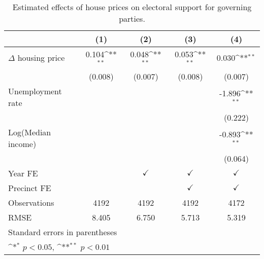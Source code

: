 \begin{table}[htbp]\centering
\def\sym#1{\ifmmode^{#1}\else\(^{#1}\)\fi}
\caption{Estimated effects of house prices on electoral support for governing parties.} \label{predv}
\begin{tabular}{l*{4}{c}}
\hline\hline
                    &\multicolumn{1}{c}{(1)}        &\multicolumn{1}{c}{(2)}        &\multicolumn{1}{c}{(3)}        &\multicolumn{1}{c}{(4)}        \\
\hline
$\Delta$ housing price&       0.104\sym{**}&       0.048\sym{**}&       0.053\sym{**}&       0.030\sym{**}\\
                    &     (0.008)        &     (0.007)        &     (0.008)        &     (0.007)        \\
[1em]
Unemployment rate   &                    &                    &                    &      -1.896\sym{**}\\
                    &                    &                    &                    &     (0.222)        \\
[1em]
Log(Median income)  &                    &                    &                    &      -0.893\sym{**}\\
                    &                    &                    &                    &     (0.064)        \\
[1em]
\hline Year FE      &                    &$\checkmark$        &$\checkmark$        &$\checkmark$        \\
[1em]
Precinct FE         &                    &                    &$\checkmark$        &$\checkmark$        \\
\hline
Observations        &        4192        &        4192        &        4192        &        4172        \\
RMSE                &       8.405        &       6.750        &       5.713        &       5.319        \\
\hline\hline
\multicolumn{5}{l}{\footnotesize Standard errors in parentheses}\\
\multicolumn{5}{l}{\footnotesize \sym{*} \(p<0.05\), \sym{**} \(p<0.01\)}\\
\end{tabular}
\end{table}
